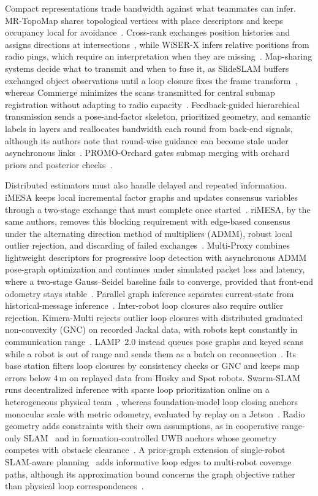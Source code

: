 Compact representations trade bandwidth against what teammates can infer. MR-TopoMap shares topological vertices with place descriptors and keeps occupancy local for avoidance~\cite{P_M36}. Cross-rank exchanges position histories and assigns directions at intersections~\cite{P_F14}, while WiSER-X infers relative positions from radio pings, which require an interpretation when they are missing~\cite{P_E32}. Map-sharing systems decide what to transmit and when to fuse it, as SlideSLAM buffers exchanged object observations until a loop closure fixes the frame transform~\cite{P_E31}, whereas Commerge minimizes the scans transmitted for central submap registration without adapting to radio capacity~\cite{P_E36}. Feedback-guided hierarchical transmission sends a pose-and-factor skeleton, prioritized geometry, and semantic labels in layers and reallocates bandwidth each round from back-end signals, although its authors note that round-wise guidance can become stale under asynchronous links~\cite{P_R21}. PROMO-Orchard gates submap merging with orchard priors and posterior checks~\cite{P_S23}.

Distributed estimators must also handle delayed and repeated information. iMESA keeps local incremental factor graphs and updates consensus variables through a two-stage exchange that must complete once started~\cite{P_E40}. riMESA, by the same authors, removes this blocking requirement with edge-based consensus under the alternating direction method of multipliers (ADMM), robust local outlier rejection, and discarding of failed exchanges~\cite{P_R23}. Multi-Proxy combines lightweight descriptors for progressive loop detection with asynchronous ADMM pose-graph optimization and continues under simulated packet loss and latency, where a two-stage Gauss--Seidel baseline fails to converge, provided that front-end odometry stays stable~\cite{P_R20}. Parallel graph inference separates current-state from historical-message inference~\cite{P_E37}. Inter-robot loop closures also require outlier rejection. Kimera-Multi rejects outlier loop closures with distributed graduated non-convexity (GNC) on recorded Jackal data, with robots kept constantly in communication range~\cite{P_K06}. LAMP~2.0 instead queues pose graphs and keyed scans while a robot is out of range and sends them as a batch on reconnection~\cite{P_K07}. Its base station filters loop closures by consistency checks or GNC and keeps map errors below 4\,m on replayed data from Husky and Spot robots. Swarm-SLAM runs decentralized inference with sparse loop prioritization online on a heterogeneous physical team~\cite{P_S10}, whereas foundation-model loop closing anchors monocular scale with metric odometry, evaluated by replay on a Jetson~\cite{P_S11}. Radio geometry adds constraints with their own assumptions, as in cooperative range-only SLAM~\cite{P_S27} and in formation-controlled UWB anchors whose geometry competes with obstacle clearance~\cite{P_S28}. A prior-graph extension of single-robot SLAM-aware planning~\cite{P_N05} adds informative loop edges to multi-robot coverage paths, although its approximation bound concerns the graph objective rather than physical loop correspondences~\cite{P_N07}.

